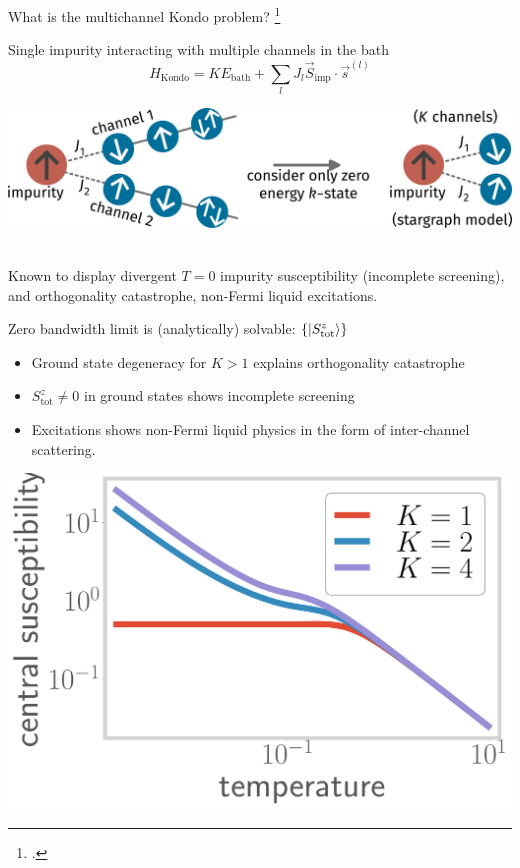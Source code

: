 \documentclass[10pt,aspectratio=169]{beamer}
\begin{document}
\begin{frame}{What is the multichannel Kondo problem?}
\footcite{Noz_blandin_1980,affleck1993exact,emery_kivelson,andrei_destri_1984}
\begin{minipage}{0.39\textwidth}
Single impurity interacting with \alert{multiple channels} in the bath
\[H_\text{Kondo} = KE_\text{bath} + \sum_{l}J_l \vec{S}_\text{imp}\cdot\vec{s}^{(l)}\]
\end{minipage}
\hspace*{\fill}
\begin{minipage}{0.59\textwidth}
\includegraphics[width=\textwidth]{MCKM_zeroB.pdf}
\end{minipage}\\[10pt]
Known to display divergent \(T=0\) impurity susceptibility (incomplete screening), and orthogonality catastrophe, \alert{non-Fermi liquid} excitations.\\[10pt]
\begin{minipage}{0.64\textwidth}
Zero bandwidth limit is (analytically) solvable: \(\left\{\ket{S_\text{tot}^z}\right\}\)\\
\begin{itemize}
	\item Ground state degeneracy for \(K > 1\) explains \alert{orthogonality catastrophe}\\[5pt]
\item \(S_\text{tot}^z \neq 0\) in ground states shows incomplete screening\\[5pt]
\item Excitations shows \alert{non-Fermi liquid} physics in the form of inter-channel scattering.
\end{itemize}
\end{minipage}
\begin{minipage}{0.35\textwidth}
\includegraphics[width=\textwidth]{MCK_imp_chi.pdf}
\end{minipage}


\end{frame}
\end{document}

